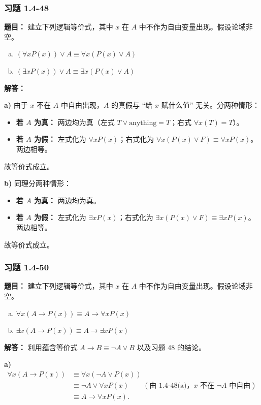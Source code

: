 \documentclass[11pt,UTF8]{article}
\begin{document}
\subsubsection*{习题 1.4-48}
\textbf{题目：} 建立下列逻辑等价式，其中 $x$ 在 $A$ 中不作为自由变量出现。假设论域非空。
\begin{enumerate}[a)]
    \item $(\forall x P(x)) \lor A \equiv \forall x (P(x) \lor A)$
    \item $(\exists x P(x)) \lor A \equiv \exists x (P(x) \lor A)$
\end{enumerate}

\textbf{解答：}

\textbf{a)} 由于 $x$ 不在 $A$ 中自由出现，$A$ 的真假与 ``给 $x$ 赋什么值'' 无关。分两种情形：
\begin{itemize}
    \item \textbf{若 $A$ 为真：} 两边均为真（左式 $T \lor \text{anything}=T$；右式 $\forall x(T)=T$）。
    \item \textbf{若 $A$ 为假：} 左式化为 $\forall x P(x)$；右式化为 $\forall x(P(x) \lor F) \equiv \forall x P(x)$。两边相等。
\end{itemize}
故等价式成立。

\textbf{b)} 同理分两种情形：
\begin{itemize}
    \item \textbf{若 $A$ 为真：} 两边均为真。
    \item \textbf{若 $A$ 为假：} 左式化为 $\exists x P(x)$；右式化为 $\exists x(P(x) \lor F) \equiv \exists x P(x)$。两边相等。
\end{itemize}
故等价式成立。

\subsubsection*{习题 1.4-50}
\textbf{题目：} 建立下列逻辑等价式，其中 $x$ 在 $A$ 中不作为自由变量出现。假设论域非空。
\begin{enumerate}[a)]
    \item $\forall x (A \to P(x)) \equiv A \to \forall x P(x)$
    \item $\exists x (A \to P(x)) \equiv A \to \exists x P(x)$
\end{enumerate}

\textbf{解答：} 利用蕴含等价式 $A \to B \equiv \neg A \lor B$ 以及习题 48 的结论。

\textbf{a)}
\begin{align*}
\forall x (A \to P(x))
&\equiv \forall x (\neg A \lor P(x)) \\
&\equiv \neg A \lor \forall x P(x) \qquad (\text{由 1.4-48(a)，}x\text{ 不在 }\neg A\text{ 中自由}) \\
&\equiv A \to \forall x P(x).
\end{align*}
\end{document}

